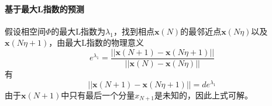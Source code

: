             \paragraph{基于最大L指数的预测}
            假设相空间$\Phi$的最大L指数为$\lambda_1 $，找到相点$\mathbf{x}(N)$的最邻近点$\mathbf{x}(N\eta)$以及$\mathbf{x}(N\eta + 1)$，由最大L指数的物理意义
            \[
                e^{\lambda_1} = \frac{||\mathbf{x}(N+1) - \mathbf{x}(N\eta +1)||}{||\mathbf{x}(N) - \mathbf{x}(N\eta)||}
            \]
            有
            \[
                ||\mathbf{x}(N+1) - \mathbf{x}(N\eta +1)|| = d e^{\lambda_1}
            \]
            由于$\mathbf{x}(N+1)$中只有最后一个分量$x_{N+1}$是未知的，因此上式可解。

% 
